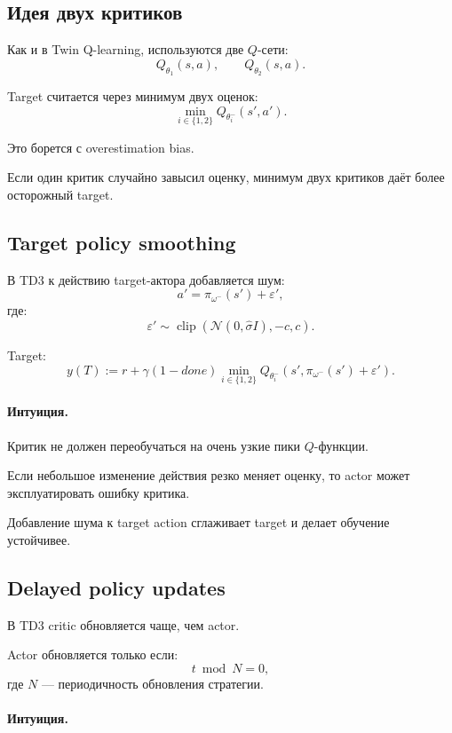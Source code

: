 \documentclass[12pt,a4paper]{article}
\begin{document}
\subsection{Идея двух критиков}

Как и в Twin Q-learning, используются две $Q$-сети:
\[
Q_{\theta_1}(s,a),
\qquad
Q_{\theta_2}(s,a).
\]

Target считается через минимум двух оценок:
\[
\min_{i\in\{1,2\}}
Q_{\theta_i^-}(s',a').
\]

Это борется с overestimation bias.

Если один критик случайно завысил оценку, минимум двух критиков даёт более осторожный target.

\subsection{Target policy smoothing}

В TD3 к действию target-актора добавляется шум:
\[
a'
=
\pi_{\omega^-}(s')+\varepsilon',
\]
где:
\[
\varepsilon'
\sim
\operatorname{clip}
\left(
\mathcal N(0,\hat\sigma I),
-c,
c
\right).
\]

Target:
\[
y(T)
:=
r
+
\gamma(1-done)
\min_{i\in\{1,2\}}
Q_{\theta_i^-}
\left(
s',
\pi_{\omega^-}(s')+\varepsilon'
\right).
\]

\paragraph{Интуиция.}

Критик не должен переобучаться на очень узкие пики $Q$-функции.

Если небольшое изменение действия резко меняет оценку, то actor может эксплуатировать ошибку критика.

Добавление шума к target action сглаживает target и делает обучение устойчивее.

\subsection{Delayed policy updates}

В TD3 critic обновляется чаще, чем actor.

Actor обновляется только если:
\[
t\bmod N=0,
\]
где $N$ --- периодичность обновления стратегии.

\paragraph{Интуиция.}
\end{document}
